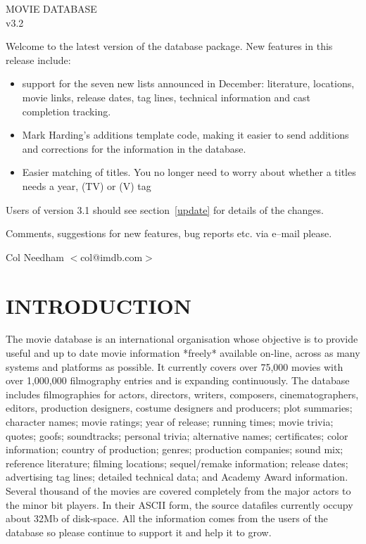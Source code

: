 
\begin{titlepage}
\vspace{6.5in}
\begin{center}
{\huge MOVIE DATABASE\\
\Large v3.2}
\end{center}
\vspace{1in}

Welcome to the latest version of the database package. New features in
this release include:
\begin{itemize}
\item support for the seven new lists announced in December: literature,
    locations, movie links, release dates, tag lines, technical information
    and cast completion tracking.
\item Mark Harding's additions template code, making it easier to send 
    additions and corrections for the information in the database.
\item Easier matching of titles. You no longer need to worry about whether
    a titles needs a year, (TV) or (V) tag

\end{itemize}

Users of version 3.1 should see section~\ref{update} for details of the changes.

Comments, suggestions for new features, bug reports etc. via e--mail 
please.

\vspace{.5in}
\noindent Col Needham $<$col@imdb.com$>$
\end{titlepage}
\clearpage

\tableofcontents
\clearpage
\section{\label{intr}INTRODUCTION}

The movie database is an international organisation whose objective
is to provide useful and up to date movie information *freely* available 
on-line, across as 
many systems and platforms as possible. It currently covers over 75,000 movies
with over 1,000,000 filmography entries and is expanding continuously. The 
database includes filmographies for actors, directors, writers, composers, 
cinematographers, editors, production designers, costume designers and 
producers; plot summaries; character names; movie ratings; year of 
release; 
running times; movie trivia; quotes; goofs; soundtracks; personal trivia;
alternative names; certificates; color information; country of production;
genres; production companies; sound mix; reference literature; filming 
locations; sequel/remake information; release dates; advertising tag lines;
detailed technical data; and Academy Award information. Several thousand of 
the movies are covered completely from the major actors to the minor bit 
players. In their ASCII form, the source datafiles currently occupy about 32Mb
of disk-space. All the information comes from the users of the database so 
please continue to support it and help it to grow.

